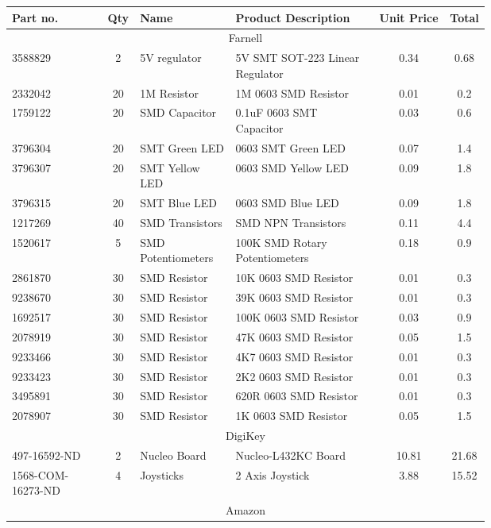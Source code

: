 \documentclass [12pt]{article}
\begin{document}
\begin{table}[H]
\begin{tabular}{||p{0.2\linewidth}|c|p{0.2\linewidth}|p{0.3\linewidth}|c|c||}
\hline
Part no. & Qty & Name & Product Description & Unit Price & Total \\
\hline
\multicolumn{6}{||c||}{Farnell}\\
\hline
3588829 & 2 & 5V regulator & 5V SMT SOT-223 Linear Regulator & 0.34 & 0.68 \\
\hline
2332042 & 20 & 1M Resistor & 1M 0603 SMD Resistor & 0.01 & 0.2\\
\hline
1759122 & 20 & SMD Capacitor & 0.1uF 0603 SMT Capacitor & 0.03 & 0.6\\
\hline
3796304 & 20 & SMT Green LED & 0603 SMT Green LED & 0.07 & 1.4\\
\hline
3796307 & 20 & SMT Yellow LED & 0603 SMD Yellow LED & 0.09 & 1.8\\
\hline
3796315 & 20 & SMT Blue LED & 0603 SMD Blue LED & 0.09 & 1.8\\
\hline
1217269 & 40 & SMD Transistors & SMD NPN Transistors & 0.11 & 4.4\\
\hline
1520617 & 5 & SMD Potentiometers & 100K SMD Rotary Potentiometers & 0.18 & 0.9\\
\hline
2861870 & 30 & SMD Resistor & 10K 0603 SMD Resistor & 0.01 & 0.3\\
\hline
9238670 & 30 & SMD Resistor & 39K 0603 SMD Resistor & 0.01 & 0.3\\
\hline
1692517 & 30 & SMD Resistor & 100K 0603 SMD Resistor & 0.03 & 0.9\\
\hline
2078919 & 30 & SMD Resistor & 47K 0603 SMD Resistor & 0.05 & 1.5\\
\hline
9233466 & 30 & SMD Resistor & 4K7 0603 SMD Resistor & 0.01 & 0.3\\
\hline
9233423 & 30 & SMD Resistor & 2K2 0603 SMD Resistor & 0.01 & 0.3\\
\hline
3495891 & 30 & SMD Resistor & 620R 0603 SMD Resistor & 0.01 & 0.3\\
\hline
2078907 & 30 & SMD Resistor & 1K 0603 SMD Resistor & 0.05 & 1.5\\
\hline
\multicolumn{6}{||c||}{DigiKey}\\
\hline
497-16592-ND & 2 & Nucleo Board & Nucleo-L432KC Board & 10.81 & 21.68 \\
\hline
1568-COM-16273-ND & 4 & Joysticks & 2 Axis Joystick & 3.88 & 15.52 \\
\hline
\multicolumn{6}{||c||}{Amazon}\\

\end{tabular}
\end{table}
\end{document}
